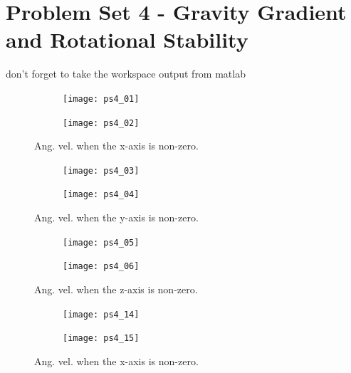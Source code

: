 \documentclass[12pt, letterpaper]{article}
\begin{document}
\section{Problem Set 4 - Gravity Gradient and Rotational Stability}

don't forget to take the workspace output from matlab

\begin{figure}[H]
	\centering
	\begin{subfigure}[b]{0.49\textwidth}
		\texttt{[image: ps4\_01]}
	\end{subfigure}
	\begin{subfigure}[b]{0.49\textwidth}
		\texttt{[image: ps4\_02]}
	\end{subfigure}
	\caption{Ang. vel. when the x-axis is non-zero.}
	\label{(4:xangvel1)}
\end{figure}


\begin{figure}[H]
	\centering
	\begin{subfigure}[b]{0.49\textwidth}
		\texttt{[image: ps4\_03]}
	\end{subfigure}
	\begin{subfigure}[b]{0.49\textwidth}
		\texttt{[image: ps4\_04]}
	\end{subfigure}
	\caption{Ang. vel. when the y-axis is non-zero.}
	\label{(4:yangvel1)}
\end{figure}


\begin{figure}[H]
	\centering
	\begin{subfigure}[b]{0.49\textwidth}
		\texttt{[image: ps4\_05]}
	\end{subfigure}
	\begin{subfigure}[b]{0.49\textwidth}
		\texttt{[image: ps4\_06]}
	\end{subfigure}
	\caption{Ang. vel. when the z-axis is non-zero.}
	\label{(4:zangvel1)}
\end{figure}



\begin{figure}[H]
	\centering
	\begin{subfigure}[b]{0.49\textwidth}
		\texttt{[image: ps4\_14]}
	\end{subfigure}
	\begin{subfigure}[b]{0.49\textwidth}
		\texttt{[image: ps4\_15]}
	\end{subfigure}
	\caption{Ang. vel. when the x-axis is non-zero.}
	\label{(4:xangvel1)}
\end{figure}
\end{document}
